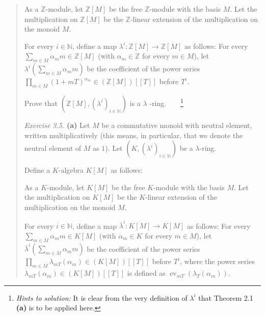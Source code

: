 \documentclass[12pt,final,notitlepage,onecolumn,german]{article}%
\begin{document}
\begin{quotation}
As a $\mathbb{Z}$-module, let $\mathbb{Z}\left[  M\right]  $ be the free
$\mathbb{Z}$-module with the basis $M$. Let the multiplication on
$\mathbb{Z}\left[  M\right]  $ be the $\mathbb{Z}$-linear extension of the
multiplication on the monoid $M$.

For every $i\in\mathbb{N}$, define a map $\lambda^{i}:\mathbb{Z}\left[
M\right]  \rightarrow\mathbb{Z}\left[  M\right]  $ as follows: For every
$\sum\limits_{m\in M}\alpha_{m}m\in\mathbb{Z}\left[  M\right]  $ (with
$\alpha_{m}\in\mathbb{Z}$ for every $m\in M$), let $\lambda^{i}\left(
\sum\limits_{m\in M}\alpha_{m}m\right)  $ be the coefficient of the power
series $\prod\limits_{m\in M}\left(  1+mT\right)  ^{\alpha_{m}}\in\left(
\mathbb{Z}\left[  M\right]  \right)  \left[  \left[  T\right]  \right]  $
before $T^{i}$.

Prove that $\left(  \mathbb{Z}\left[  M\right]  ,\left(  \lambda^{i}\right)
_{i\in\mathbb{N}}\right)  $ is a $\lambda$%
-ring.\ \ \ \ \footnote{\textit{Hints to solution:} It is clear from the very
definition of $\lambda^{i}$ that Theorem 2.1 \textbf{(a)} is to be applied
here.}

\textit{Exercise 3.5.} \textbf{(a)} Let $M$ be a commutative monoid with
neutral element, written multiplicatively (this means, in particular, that we
denote the neutral element of $M$ as $1$). Let $\left(  K,\left(  \lambda
^{i}\right)  _{i\in\mathbb{N}}\right)  $ be a $\lambda$-ring.

Define a $K$-algebra $K\left[  M\right]  $ as follows:

As a $K$-module, let $K\left[  M\right]  $ be the free $K$-module with the
basis $M$. Let the multiplication on $K\left[  M\right]  $ be the $K$-linear
extension of the multiplication on the monoid $M$.

For every $i\in\mathbb{N}$, define a map $\overline{\lambda}^{i}:K\left[
M\right]  \rightarrow K\left[  M\right]  $ as follows: For every
$\sum\limits_{m\in M}\alpha_{m}m\in K\left[  M\right]  $ (with $\alpha_{m}\in
K$ for every $m\in M$), let $\overline{\lambda}^{i}\left(  \sum\limits_{m\in
M}\alpha_{m}m\right)  $ be the coefficient of the power series $\prod
\limits_{m\in M}\lambda_{mT}\left(  \alpha_{m}\right)  \in\left(  K\left[
M\right]  \right)  \left[  \left[  T\right]  \right]  $ before $T^{i}$, where
the power series $\lambda_{mT}\left(  \alpha_{m}\right)  \in\left(  K\left[
M\right]  \right)  \left[  \left[  T\right]  \right]  $ is defined as
$\operatorname*{ev}_{mT}\left(  \lambda_{T}\left(  \alpha_{m}\right)  \right)
$.


\end{quotation}
\end{document}
